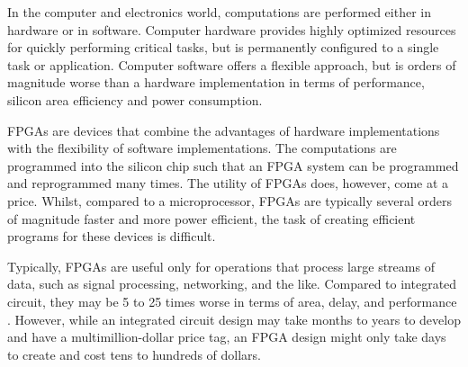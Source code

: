 In the computer and electronics world, computations are performed either in 
hardware or in software. Computer hardware provides highly optimized resources
for quickly performing critical tasks, but is permanently configured to a 
single task or application. Computer software offers a flexible approach, but is
orders of magnitude worse than a hardware implementation in terms of 
performance, silicon area efficiency and power consumption.

FPGAs are devices that combine the advantages of hardware implementations with 
the flexibility of software implementations. The computations are programmed 
into the silicon chip such that an FPGA system can be programmed and 
reprogrammed many times. The utility of FPGAs does, however, come at a price. 
Whilst, compared to a microprocessor, FPGAs are typically several orders of 
magnitude faster and more power efficient, the task of creating efficient 
programs for these devices is difficult.

Typically, FPGAs are useful only for operations that process large streams of 
data, such as signal processing, networking, and the like. Compared to 
integrated circuit, they may be 5 to 25 times worse in terms of area, delay, and
performance \cite{Hauck:2007}. However, while an integrated circuit design may 
take months to years to develop and have a multimillion-dollar price tag, an 
FPGA design might only take days to create and cost tens to hundreds of dollars.
